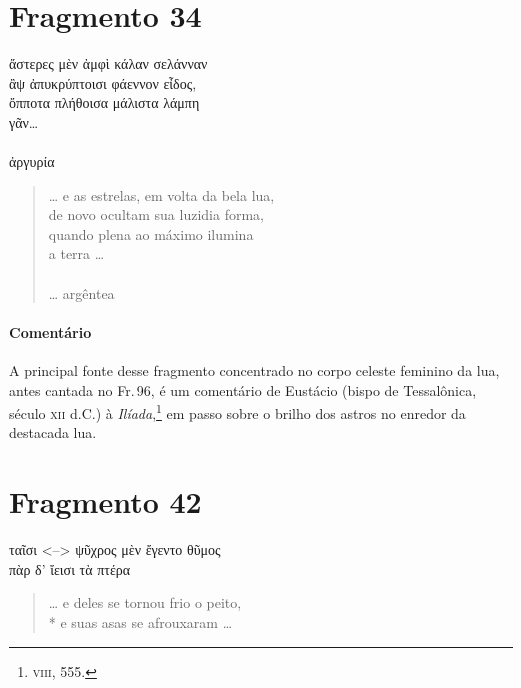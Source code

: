 \section{Fragmento 34}

\begin{gkverse}
ἄστερες μὲν ἀμφὶ κάλαν σελάνναν\\
ἂψ ἀπυκρύπτοισι φάεννον εἶδος,\\
ὄπποτα πλήθοισα μάλιστα λάμπη\\
γᾶν\ldots{}\\
\hspace*{23mm}\\
ἀργυρία
\end{gkverse}

\begin{verse}
\ldots{} e as estrelas, em volta da bela lua,\\
de novo ocultam sua luzidia forma,\\
quando plena ao máximo ilumina\\
a terra \ldots{}\\
\hspace*{23mm}\\
\ldots{} argêntea
\end{verse}

\medskip

{\paragraph{Comentário} A principal fonte desse fragmento concentrado no corpo celeste feminino da lua, antes cantada no Fr.\,96, é
um comentário de Eustácio (bispo de Tessalônica, século \textsc{xii} d.C.) à
\textit{Ilíada},\footnote{\textsc{viii}, 555.} em passo sobre o brilho dos astros no enredor da destacada lua.} 


\pagebreak
\section{Fragmento 42}

\begin{gkverse}
ταῖσι <--> ψῦχρος μὲν ἔγεντο θῦμος\\
πὰρ δ’ ἴεισι τὰ πτέρα
\end{gkverse}

\begin{verse}
\ldots{} e deles se tornou frio o peito,\\*
e suas asas se afrouxaram \ldots{}
\end{verse}

